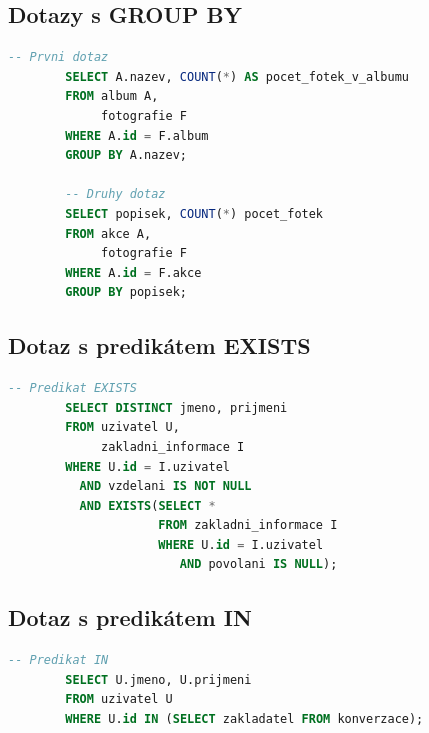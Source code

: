 \documentclass[11pt,a4paper]{article}
\begin{document}
\subsection{Dotazy s GROUP BY}
\begin{minipage}{\linewidth}
    \begin{center}
        \begin{lstlisting}[language=sql]
        -- Prvni dotaz
        SELECT A.nazev, COUNT(*) AS pocet_fotek_v_albumu
        FROM album A,
             fotografie F
        WHERE A.id = F.album
        GROUP BY A.nazev;
        
        -- Druhy dotaz
        SELECT popisek, COUNT(*) pocet_fotek
        FROM akce A,
             fotografie F
        WHERE A.id = F.akce
        GROUP BY popisek;\end{lstlisting}
    \end{center}
    
    \subsection{Dotaz s predikátem EXISTS}
    \begin{center}
        \begin{lstlisting}[language=sql]
        -- Predikat EXISTS
        SELECT DISTINCT jmeno, prijmeni
        FROM uzivatel U,
             zakladni_informace I
        WHERE U.id = I.uzivatel
          AND vzdelani IS NOT NULL
          AND EXISTS(SELECT *
                     FROM zakladni_informace I
                     WHERE U.id = I.uzivatel
                        AND povolani IS NULL);\end{lstlisting}
    \end{center}
\end{minipage}

\subsection{Dotaz s predikátem IN}
\begin{minipage}{\linewidth}
    \begin{center}
        \begin{lstlisting}[language=sql]
        -- Predikat IN
        SELECT U.jmeno, U.prijmeni
        FROM uzivatel U
        WHERE U.id IN (SELECT zakladatel FROM konverzace);\end{lstlisting}  
    \end{center}
\end{minipage}
\end{document}
